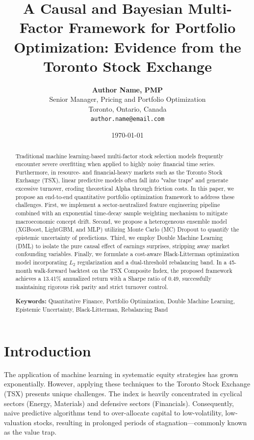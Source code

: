 \documentclass[11pt, a4paper]{article}
\title{\textbf{A Causal and Bayesian Multi-Factor Framework for Portfolio Optimization: Evidence from the Toronto Stock Exchange}}
\author{\textbf{Author Name, PMP} \\
Senior Manager, Pricing and Portfolio Optimization \\
Toronto, Ontario, Canada \\
\texttt{author.name@email.com}}
\date{\today}
\begin{document}
\maketitle

\begin{abstract}
\noindent Traditional machine learning-based multi-factor stock selection models frequently encounter severe overfitting when applied to highly noisy financial time series. Furthermore, in resource- and financial-heavy markets such as the Toronto Stock Exchange (TSX), linear predictive models often fall into "value traps" and generate excessive turnover, eroding theoretical Alpha through friction costs. In this paper, we propose an end-to-end quantitative portfolio optimization framework to address these challenges. First, we implement a sector-neutralized feature engineering pipeline combined with an exponential time-decay sample weighting mechanism to mitigate macroeconomic concept drift. Second, we propose a heterogeneous ensemble model (XGBoost, LightGBM, and MLP) utilizing Monte Carlo (MC) Dropout to quantify the epistemic uncertainty of predictions. Third, we employ Double Machine Learning (DML) to isolate the pure causal effect of earnings surprises, stripping away market confounding variables. Finally, we formulate a cost-aware Black-Litterman optimization model incorporating $L_2$ regularization and a dual-threshold rebalancing band. In a 45-month walk-forward backtest on the TSX Composite Index, the proposed framework achieves a 13.41\% annualized return with a Sharpe ratio of 0.49, successfully maintaining rigorous risk parity and strict turnover control.

\vspace{0.5cm}
\noindent \textbf{Keywords:} Quantitative Finance, Portfolio Optimization, Double Machine Learning, Epistemic Uncertainty, Black-Litterman, Rebalancing Band
\end{abstract}

\section{Introduction}
The application of machine learning in systematic equity strategies has grown exponentially. However, applying these techniques to the Toronto Stock Exchange (TSX) presents unique challenges. The index is heavily concentrated in cyclical sectors (Energy, Materials) and defensive sectors (Financials). Consequently, naive predictive algorithms tend to over-allocate capital to low-volatility, low-valuation stocks, resulting in prolonged periods of stagnation—commonly known as the value trap.
\end{document}
